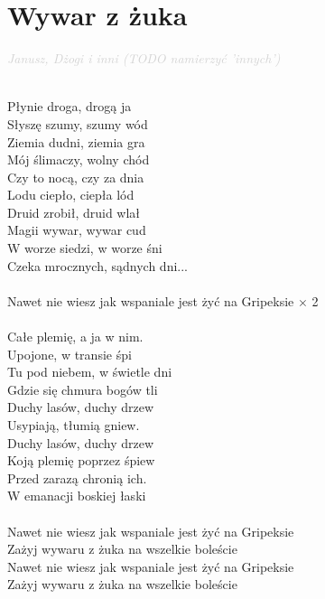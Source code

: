 \documentclass[a5paper, 10pt]{book}
\begin{document}
\newpage
\section{Wywar z żuka}\textcolor{lightgray}{\textit{Janusz, Dżogi i inni (TODO namierzyć 'innych')}}\\~\\
\begin{minipage}[t]{0.85\textwidth}
  Płynie droga, drogą ja             \\
  Słyszę szumy, szumy wód\\
  Ziemia dudni, ziemia gra      \\
  Mój ślimaczy, wolny chód   \\
  Czy to nocą, czy za dnia          \\
  Lodu ciepło, ciepła lód\\
  Druid zrobił, druid wlał             \\
  Magii wywar, wywar cud\\
  \hspace*{3mm}W worze siedzi, w worze śni     \\
  \hspace*{3mm}Czeka mrocznych, sądnych dni...\\
  \\
  \hspace*{6mm}Nawet nie wiesz jak wspaniale jest żyć na Gripeksie $\times$ 2 \\
  \\
  Całe plemię, a ja w nim.       \\
  Upojone, w transie śpi\\
  Tu pod niebem, w świetle dni\\
  Gdzie się chmura bogów tli   \\
  Duchy lasów, duchy drzew      \\
  Usypiają, tłumią gniew.      \\
  Duchy lasów, duchy drzew    \\
  Koją plemię poprzez śpiew    \\
  \hspace*{3mm}Przed zarazą chronią ich.       \\
  \hspace*{3mm}W emanacji boskiej łaski\\
  \\
  \hspace*{6mm}Nawet nie wiesz jak wspaniale jest żyć na Gripeksie        \\
  \hspace*{6mm}Zażyj wywaru z żuka na wszelkie boleście           	       \\
  \hspace*{6mm}Nawet nie wiesz jak wspaniale jest żyć na Gripeksie        \\
  \hspace*{6mm}Zażyj wywaru z żuka na wszelkie boleście   \\


\end{minipage}
\end{document}
